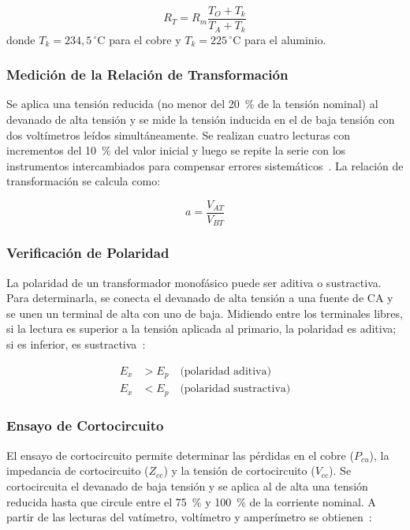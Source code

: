 \begin{equation}
    R_T = R_m \frac{T_O + T_k}{T_A + T_k}
\end{equation}
donde $T_k = 234,5\,\mathrm{^\circ C}$ para el cobre y $T_k = 225\,\mathrm{^\circ C}$ para el aluminio.

\subsubsection{Medición de la Relación de Transformación}

Se aplica una tensión reducida (no menor del 20~\% de la tensión nominal) al devanado de alta tensión y se mide la tensión inducida en el de baja tensión con dos voltímetros leídos simultáneamente. Se realizan cuatro lecturas con incrementos del 10~\% del valor inicial y luego se repite la serie con los instrumentos intercambiados para compensar errores sistemáticos~\cite{covenin}. La relación de transformación se calcula como:

\begin{equation}
    a = \frac{V_{AT}}{V_{BT}}
\end{equation}

\subsubsection{Verificación de Polaridad}

La polaridad de un transformador monofásico puede ser aditiva o sustractiva. Para determinarla, se conecta el devanado de alta tensión a una fuente de CA y se unen un terminal de alta con uno de baja. Midiendo entre los terminales libres, si la lectura es superior a la tensión aplicada al primario, la polaridad es aditiva; si es inferior, es sustractiva~\cite{mit}:

\begin{align}
    E_x &> E_p \quad \text{(polaridad aditiva)} \\
    E_x &< E_p \quad \text{(polaridad sustractiva)}
\end{align}

\subsubsection{Ensayo de Cortocircuito}

El ensayo de cortocircuito permite determinar las pérdidas en el cobre ($P_{cu}$), la impedancia de cortocircuito ($Z_{cc}$) y la tensión de cortocircuito ($V_{cc}$). Se cortocircuita el devanado de baja tensión y se aplica al de alta una tensión reducida hasta que circule entre el 75~\% y 100~\% de la corriente nominal. A partir de las lecturas del vatímetro, voltímetro y amperímetro se obtienen~\cite{covenin}:

